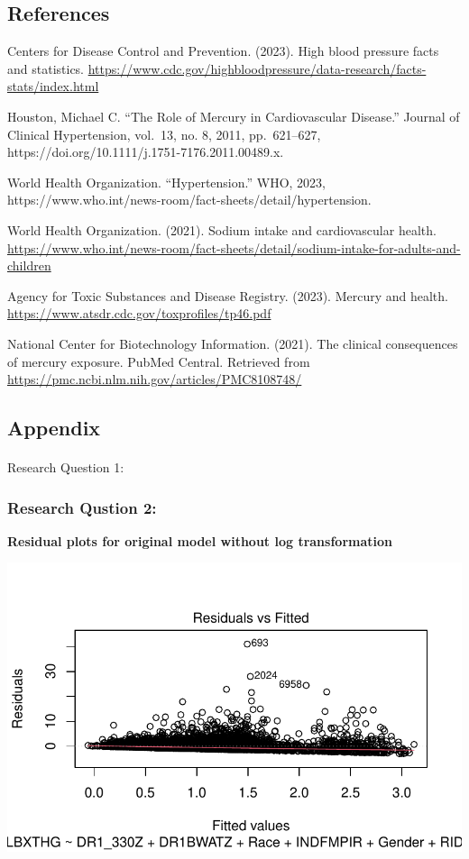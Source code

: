 \documentclass[
  letterpaper,
  DIV=11,
  numbers=noendperiod]{scrartcl}
\makeatletter
\let\oldparagraph\paragraph
\renewcommand{\paragraph}{
    \@ifstar
      \xxxParagraphStar
      \xxxParagraphNoStar
  }
\newcommand{\xxxParagraphStar}[1]{\oldparagraph*{#1}\mbox{}}
\newcommand{\xxxParagraphNoStar}[1]{\oldparagraph{#1}\mbox{}}
\makeatother
\begin{document}
\subsection{References}\label{references}

Centers for Disease Control and Prevention. (2023). High blood pressure
facts and statistics.
\url{https://www.cdc.gov/highbloodpressure/data-research/facts-stats/index.html}

Houston, Michael C. ``The Role of Mercury in Cardiovascular Disease.''
Journal of Clinical Hypertension, vol.~13, no. 8, 2011, pp.~621--627,
https://doi.org/10.1111/j.1751-7176.2011.00489.x.

World Health Organization. ``Hypertension.'' WHO, 2023,
https://www.who.int/news-room/fact-sheets/detail/hypertension.

World Health Organization. (2021). Sodium intake and cardiovascular
health.
\url{https://www.who.int/news-room/fact-sheets/detail/sodium-intake-for-adults-and-children}

Agency for Toxic Substances and Disease Registry. (2023). Mercury and
health. \url{https://www.atsdr.cdc.gov/toxprofiles/tp46.pdf}

National Center for Biotechnology Information. (2021). The clinical
consequences of mercury exposure. PubMed Central. Retrieved from
\url{https://pmc.ncbi.nlm.nih.gov/articles/PMC8108748/}

\subsection{Appendix}\label{appendix}

\paragraph{Research Question 1:}\label{research-question-1}

\subsubsection{Research Qustion 2:}\label{research-qustion-2}

\textbf{Residual plots for original model without log transformation}

\includegraphics{_IDS702_Final_Report_Feedback_files/figure-pdf/unnamed-chunk-18-1.pdf}
\end{document}
